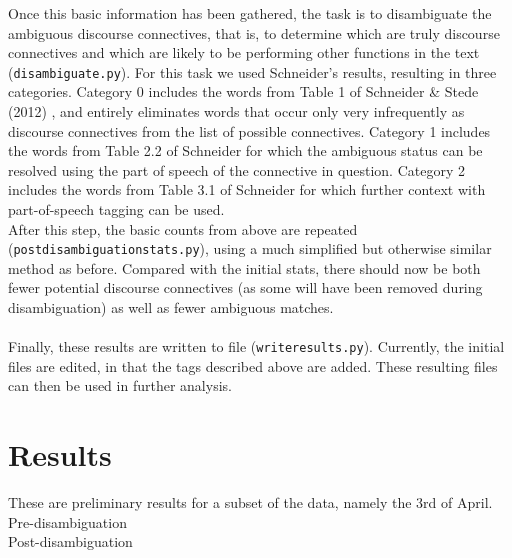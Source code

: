 \documentclass[11pt]{article}
\def\mono#1{\texttt{#1}}  %
\begin{document}
Once this basic information has been gathered, the task is to disambiguate the ambiguous discourse connectives, that is, to determine which are truly discourse connectives and which are likely to be performing other functions in the text (\mono{disambiguate.py}).  For this task we used Schneider's results, resulting in three categories.  Category 0 includes the words from Table 1 of Schneider \& Stede (2012) \cite{schneider2}, and entirely eliminates words that occur only very infrequently as discourse connectives from the list of possible connectives.  Category 1 includes the words from Table 2.2 of Schneider \cite{schneider1} for which the ambiguous status can be resolved using the part of speech of the connective in question.  Category 2 includes the words from Table 3.1 of Schneider \cite{schneider1}  for which further context with part-of-speech tagging can be used. \\

After this step, the basic counts from above are repeated (\mono{post\textunderscore disambiguation\textunderscore stats.py}), using a much simplified but otherwise similar method as before.  Compared with the initial stats, there should now be both fewer potential discourse connectives (as some will have been removed during disambiguation) as well as fewer ambiguous matches.\\
\\
Finally, these results are written to file (\mono{write\textunderscore results.py}).  Currently, the initial files are edited, in that the tags described above are added.  These resulting files can then be used in further analysis.

\section{Results}

These are preliminary results for a subset of the data, namely the 3rd of April. \\

Pre-disambiguation\\



Post-disambiguation\\
\end{document}
